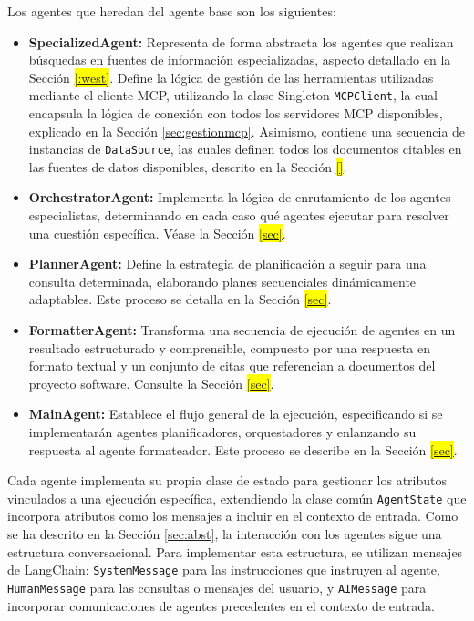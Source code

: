 Los agentes que heredan del agente base son los siguientes:
\begin{itemize}
  \item \textbf{SpecializedAgent:} Representa de forma abstracta los agentes que realizan búsquedas en fuentes de información especializadas, aspecto detallado en la Sección \colorbox{yellow}{\ref{:west}}. Define la lógica de gestión de las herramientas utilizadas mediante el cliente MCP, utilizando la clase Singleton \texttt{MCPClient}, la cual encapsula la lógica de conexión con todos los servidores MCP disponibles, explicado en la Sección \ref{sec:gestionmcp}. Asimismo, contiene una secuencia de instancias de \texttt{DataSource}, las cuales definen todos los documentos citables en las fuentes de datos disponibles, descrito en la Sección \colorbox{yellow}{\ref{}}.
  \item \textbf{OrchestratorAgent:} Implementa la lógica de enrutamiento de los agentes especialistas, determinando en cada caso qué agentes ejecutar para resolver una cuestión específica. Véase la Sección \colorbox{yellow}{\ref{sec}}.
  \item \textbf{PlannerAgent:} Define la estrategia de planificación a seguir para una consulta determinada, elaborando planes secuenciales dinámicamente adaptables. Este proceso se detalla en la Sección \colorbox{yellow}{\ref{sec}}.
  \item \textbf{FormatterAgent:} Transforma una secuencia de ejecución de agentes en un resultado estructurado y comprensible, compuesto por una respuesta en formato textual y un conjunto de citas que referencian a documentos del proyecto software. Consulte la Sección \colorbox{yellow}{\ref{sec}}.
  \item \textbf{MainAgent:} Establece el flujo general de la ejecución, especificando si se implementarán agentes planificadores, orquestadores y enlanzando su respuesta al agente formateador. Este proceso se describe en la Sección \colorbox{yellow}{\ref{sec}}.
\end{itemize}

Cada agente implementa su propia clase de estado para gestionar los atributos vinculados a una ejecución específica, extendiendo la clase común \texttt{AgentState} que incorpora atributos como los mensajes a incluir en el contexto de entrada. Como se ha descrito en la Sección \ref{sec:abst}, la interacción con los agentes sigue una estructura conversacional. Para implementar esta estructura, se utilizan mensajes de LangChain: \texttt{SystemMessage} para las instrucciones que instruyen al agente, \texttt{HumanMessage} para las consultas o mensajes del usuario, y \texttt{AIMessage} para incorporar comunicaciones de agentes precedentes en el contexto de entrada.

